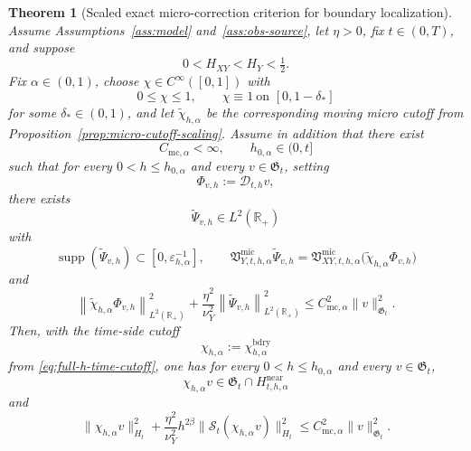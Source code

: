 \documentclass[11pt,a4paper]{amsart}
\theoremstyle{plain}
\newtheorem{theorem}{Theorem}[section]
\theoremstyle{definition}
\theoremstyle{remark}
\newcommand{\R}{\mathbb{R}}
\begin{document}
\begin{theorem}[Scaled exact micro-correction criterion for boundary localization]
\label{thm:smooth-cutoff-criterion}
Assume Assumptions~\ref{ass:model} and~\ref{ass:obs-source}, let \(\eta>0\), fix \(t\in(0,T)\),
and suppose
\[
0<H_{XY}<H_Y<\tfrac12.
\]
Fix \(\alpha\in(0,1)\), choose \(\chi\in C^\infty([0,1])\) with
\[
0\le \chi\le1,
\qquad
\chi\equiv1\ \text{on }[0,1-\delta_*]
\]
for some \(\delta_*\in(0,1)\), and let \(\widetilde\chi_{h,\alpha}\) be the corresponding moving
micro cutoff from Proposition~\ref{prop:micro-cutoff-scaling}. Assume in addition that there exist
\[
C_{\mathrm{mc},\alpha}<\infty,
\qquad
h_{0,\alpha}\in(0,t]
\]
such that for every \(0<h\le h_{0,\alpha}\) and every \(v\in\mathfrak G_t\), setting
\[
\Phi_{v,h}:=\mathcal D_{t,h}v,
\]
there exists
\[
\widetilde\Psi_{v,h}\in L^2(\R_+)
\]
with
\begin{equation}\label{eq:smooth-cutoff-criterion-exact}
\operatorname{supp}(\widetilde\Psi_{v,h})
\subset [0,\varepsilon_{h,\alpha}^{-1}],
\qquad
\mathfrak V_{Y,t,h,\alpha}^{\mathrm{mic}}\widetilde\Psi_{v,h}
=
\mathfrak V_{XY,t,h,\alpha}^{\mathrm{mic}}
\bigl(
\widetilde\chi_{h,\alpha}\Phi_{v,h}
\bigr)
\end{equation}
and
\begin{equation}\label{eq:smooth-cutoff-criterion-bound}
\left\|
\widetilde\chi_{h,\alpha}\Phi_{v,h}
\right\|_{L^2(\R_+)}^2
+
\frac{\eta^2}{\nu_Y^2}
\left\|
\widetilde\Psi_{v,h}
\right\|_{L^2(\R_+)}^2
\le
C_{\mathrm{mc},\alpha}^2\|v\|_{\mathfrak G_t}^2.
\end{equation}
Then, with the time-side cutoff
\[
\chi_{h,\alpha}:=\chi_{h,\alpha}^{\mathrm{bdry}}
\]
from \eqref{eq:full-h-time-cutoff}, one has for every \(0<h\le h_{0,\alpha}\) and every
\(v\in\mathfrak G_t\),
\begin{equation}\label{eq:smooth-cutoff-criterion-scaled}
\chi_{h,\alpha}v\in \mathfrak G_t\cap H_{t,h,\alpha}^{\mathrm{near}}
\end{equation}
and
\begin{equation}\label{eq:smooth-cutoff-criterion-scaled-bound}
\|\chi_{h,\alpha}v\|_{H_t}^2
+
\frac{\eta^2}{\nu_Y^2}
h^{2\beta}
\|\mathcal S_t(\chi_{h,\alpha}v)\|_{H_t}^2
\le
C_{\mathrm{mc},\alpha}^2\|v\|_{\mathfrak G_t}^2.
\end{equation}
\end{theorem}
\end{document}
